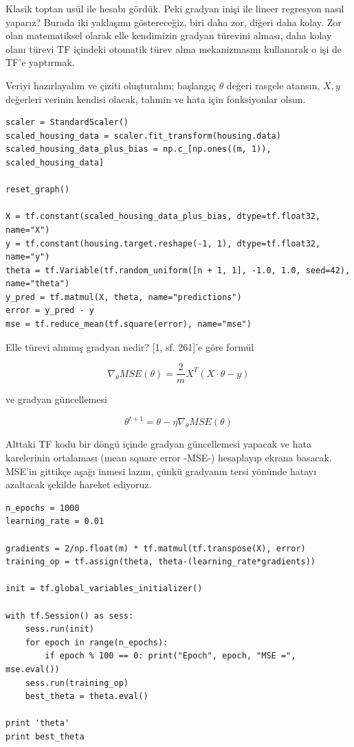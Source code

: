 \documentclass[12pt,fleqn]{article}\usepackage{../../common}
\begin{document}
Klasik toptan usül ile hesabı gördük. Peki gradyan inişi ile lineer
regresyon nasıl yaparız? Burada iki yaklaşımı göstereceğiz, biri daha zor,
diğeri daha kolay. Zor olan matematiksel olarak elle kendimizin gradyan
türevini alması, daha kolay olanı türevi TF içindeki otomatik türev alma
mekanizmasını kullanarak o işi de TF'e yaptırmak.

Veriyi hazırlayalım ve çiziti oluşturalım; başlangıç $\theta$ değeri
rasgele atansın, $X,y$ değerleri verinin kendisi olacak, tahmin ve hata
için fonksiyonlar olsun.

\begin{verbatim}
scaler = StandardScaler()
scaled_housing_data = scaler.fit_transform(housing.data)
scaled_housing_data_plus_bias = np.c_[np.ones((m, 1)), scaled_housing_data]

reset_graph()

X = tf.constant(scaled_housing_data_plus_bias, dtype=tf.float32, name="X")
y = tf.constant(housing.target.reshape(-1, 1), dtype=tf.float32, name="y")
theta = tf.Variable(tf.random_uniform([n + 1, 1], -1.0, 1.0, seed=42), name="theta")
y_pred = tf.matmul(X, theta, name="predictions")
error = y_pred - y
mse = tf.reduce_mean(tf.square(error), name="mse")
\end{verbatim}

Elle türevi alınmış gradyan nedir? [1, sf. 261]'e göre formül

$$ 
\nabla_\theta MSE(\theta) = \frac{2}{m} X^T (X \cdot \theta - y)
$$  

ve gradyan güncellemesi

$$ 
\theta^{t+1} = \theta - \eta \nabla_\theta MSE(\theta)
$$

Alttaki TF kodu bir döngü içinde gradyan güncellemesi yapacak ve hata
karelerinin ortalaması (mean square error -MSE-) hesaplayıp ekrana
basacak. MSE'in gittikçe aşağı inmesi lazım, çünkü gradyanın tersi yönünde
hatayı azaltacak şekilde hareket ediyoruz. 

\begin{verbatim}
n_epochs = 1000
learning_rate = 0.01

gradients = 2/np.float(m) * tf.matmul(tf.transpose(X), error)
training_op = tf.assign(theta, theta-(learning_rate*gradients))

init = tf.global_variables_initializer()

with tf.Session() as sess:
    sess.run(init)
    for epoch in range(n_epochs):
        if epoch % 100 == 0: print("Epoch", epoch, "MSE =", mse.eval())
	sess.run(training_op)    
    best_theta = theta.eval()
    
print 'theta'
print best_theta
\end{verbatim}
\end{document}
